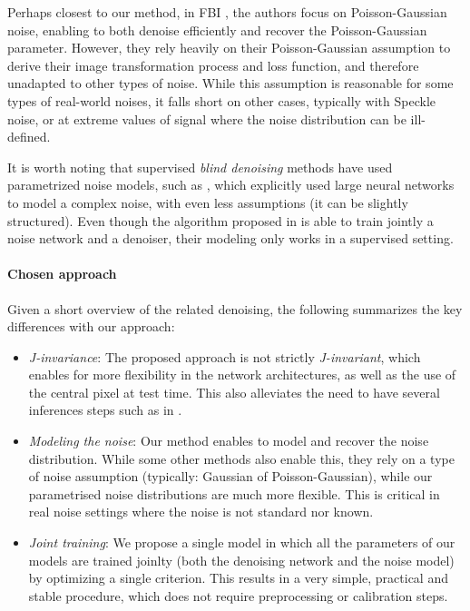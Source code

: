 \documentclass[lettersize,journal]{IEEEtran}
\begin{document}
Perhaps closest to our method, in FBI \cite{byun2021fbi}, the authors focus on Poisson-Gaussian noise, enabling to both denoise efficiently and recover the Poisson-Gaussian parameter. However, they rely heavily on their Poisson-Gaussian assumption to derive their image transformation process and loss function, and therefore unadapted to other types of noise. While this assumption is reasonable for some types of real-world noises, it falls short on other cases, typically with Speckle noise, or at extreme values of signal where the noise distribution can be ill-defined.

It is worth noting that supervised \textit{blind denoising} methods have used parametrized noise models, such as \cite{zhang2017beyond,yue2019variational}, which explicitly used large neural networks to model a complex noise, with even less assumptions (it can be slightly structured). Even though the algorithm proposed in \cite{yue2019variational} is able to train jointly a noise network and a denoiser, their modeling only works in a supervised setting.

\paragraph{Chosen approach} Given a short overview of the related denoising, the following summarizes the key differences with our approach:
\begin{itemize}
  \item \textit{J-invariance}: The proposed approach is not strictly \textit{J-invariant}, which enables for more flexibility in the network architectures, as well as the use of the central pixel at test time. This also alleviates the need to have several inferences steps such as in \cite{laine2019high}.
  \item \textit{Modeling the noise}: Our method enables to model and recover the noise distribution. While some other methods also enable this, they rely on a type of noise assumption (typically: Gaussian of Poisson-Gaussian), while our parametrised noise distributions are much more flexible. This is critical in real noise settings where the noise is not standard nor known.
  \item \textit{Joint training}: We propose a single model in which all the parameters of our models are trained joinlty (both the denoising network and the noise model) by optimizing a single criterion. This results in a very simple, practical and stable procedure, which does not require preprocessing or calibration steps.
\end{itemize}
\end{document}
